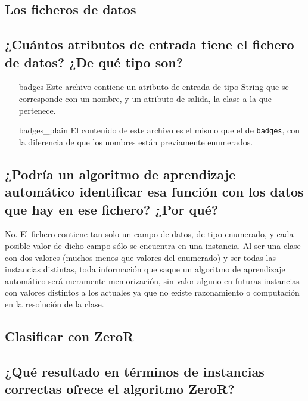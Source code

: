\documentclass[12pt]{article}
\begin{document}
\tableofcontents

\newpage

\begin{center}
\section{Los ficheros de datos}
\end{center}

\subsection*{\small ¿Cuántos atributos de entrada tiene el fichero de datos?
¿De qué tipo son?}

\begin{itemize}
  \item[badges] Este archivo contiene un atributo de entrada de tipo String que
  se corresponde con un nombre, y un atributo de salida, la clase a la que
  pertenece.
  \item[badges\_plain] El contenido de este archivo es el mismo que el de
  \texttt{badges}, con la diferencia de que los nombres están previamente
  enumerados.
\end{itemize}

\subsection*{\small ¿Podría un algoritmo de aprendizaje automático identificar
esa función con los datos que hay en ese fichero? ¿Por qué?}

No. El fichero contiene tan solo un campo de datos, de tipo enumerado, y cada
posible valor de dicho campo sólo se encuentra en una instancia. Al ser una
clase con dos valores (muchos menos que valores del enumerado) y ser todas las
instancias distintas, toda información que saque un algoritmo de aprendizaje
automático será meramente memorización, sin valor alguno en futuras instancias
con valores distintos a los actuales ya que no existe razonamiento o
computación en la resolución de la clase.

\newpage

\begin{center}
\section{Clasificar con ZeroR}
\end{center}

\subsection*{\small ¿Qué resultado en términos de instancias correctas ofrece el
algoritmo ZeroR?}
\end{document}

